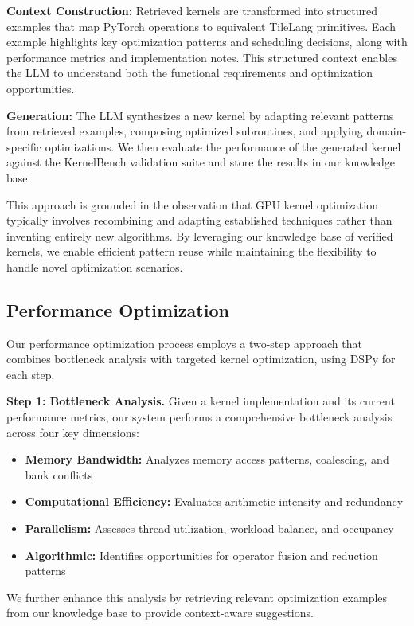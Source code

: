 \documentclass{article}
\begin{document}
\textbf{Context Construction:} Retrieved kernels are transformed into structured examples that map PyTorch operations to equivalent TileLang primitives. Each example highlights key optimization patterns and scheduling decisions, along with performance metrics and implementation notes. This structured context enables the LLM to understand both the functional requirements and optimization opportunities.

\textbf{Generation:} The LLM synthesizes a new kernel by adapting relevant patterns from retrieved examples, composing optimized subroutines, and applying domain-specific optimizations. We then evaluate the performance of the generated kernel against the KernelBench \cite{ouyang2025kernelbenchllmswriteefficient} validation suite and store the results in our knowledge base.

This approach is grounded in the observation that GPU kernel optimization typically involves recombining and adapting established techniques rather than inventing entirely new algorithms. By leveraging our knowledge base of verified kernels, we enable efficient pattern reuse while maintaining the flexibility to handle novel optimization scenarios.

\subsection{Performance Optimization}
Our performance optimization process employs a two-step approach that combines bottleneck analysis with targeted kernel optimization, using DSPy \cite{dspy2023} for each step.

\textbf{Step 1: Bottleneck Analysis.} Given a kernel implementation and its current performance metrics, our system performs a comprehensive bottleneck analysis across four key dimensions:

\begin{itemize}
    \item \textbf{Memory Bandwidth:} Analyzes memory access patterns, coalescing, and bank conflicts
    \item \textbf{Computational Efficiency:} Evaluates arithmetic intensity and redundancy
    \item \textbf{Parallelism:} Assesses thread utilization, workload balance, and occupancy
    \item \textbf{Algorithmic:} Identifies opportunities for operator fusion and reduction patterns
\end{itemize}

We further enhance this analysis by retrieving relevant optimization examples from our knowledge base to provide context-aware suggestions.
\end{document}
